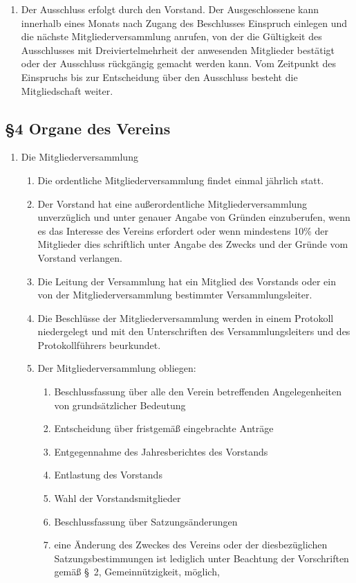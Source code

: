 \documentclass[12pt,a4paper]{article}
\begin{document}
\begin{enumerate}
\begin{enumerate}
\item Der Ausschluss erfolgt durch den Vorstand. Der Ausgeschlossene kann innerhalb eines Monats nach Zugang des Beschlusses Einspruch einlegen und die nächste Mitgliederversammlung anrufen, von der die Gültigkeit des Ausschlusses mit Dreiviertelmehrheit der anwesenden Mitglieder bestätigt oder der Ausschluss rückgängig gemacht werden kann. Vom Zeitpunkt des Einspruchs bis zur Entscheidung über den Ausschluss besteht die Mitgliedschaft weiter.
\end{enumerate}
\end{enumerate}

\subsection*{§4 Organe des Vereins}
\begin{enumerate}
\item Die Mitgliederversammlung
\begin{enumerate}
\item Die ordentliche Mitgliederversammlung findet einmal jährlich statt.
\item Der Vorstand hat eine außerordentliche Mitgliederversammlung unverzüglich und unter genauer Angabe von Gründen einzuberufen, wenn es das Interesse des Vereins erfordert oder wenn mindestens 10\% der Mitglieder dies schriftlich unter Angabe des Zwecks und der Gründe vom Vorstand verlangen.
\item Die Leitung der Versammlung hat ein Mitglied des Vorstands oder ein von der Mitgliederversammlung bestimmter Versammlungsleiter.
\item Die Beschlüsse der Mitgliederversammlung werden in einem Protokoll niedergelegt und mit den Unterschriften des Versammlungsleiters und des Protokollführers beurkundet.
\item Der Mitgliederversammlung obliegen:
\begin{enumerate}
\item Beschlussfassung über alle den Verein betreffenden Angelegenheiten von grundsätzlicher Bedeutung
\item Entscheidung über fristgemäß eingebrachte Anträge
\item Entgegennahme des Jahresberichtes des Vorstands
\item Entlastung des Vorstands
\item Wahl der Vorstandsmitglieder
\item Beschlussfassung über Satzungsänderungen
\item eine Änderung des Zweckes des Vereins oder der diesbezüglichen Satzungsbestimmungen ist lediglich unter Beachtung der Vorschriften gemäß §~2, Gemeinnützigkeit, möglich,

\end{enumerate}
\end{enumerate}
\end{enumerate}
\end{document}
